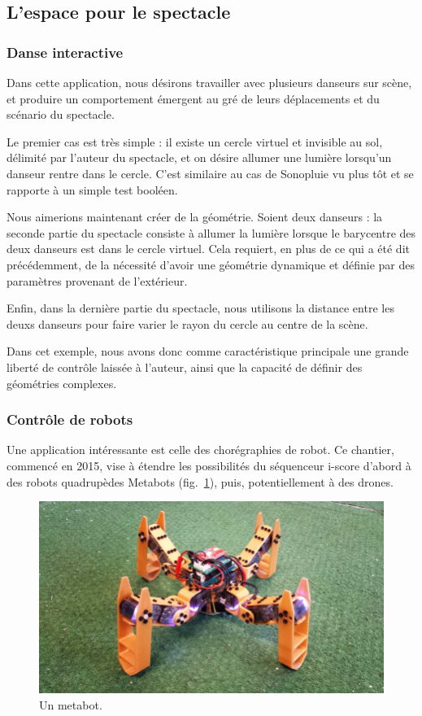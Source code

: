 \documentclass[french,12pt]{article}
\begin{document}
\subsection{L'espace pour le spectacle}
\subsubsection{Danse interactive}
Dans cette application, nous désirons travailler avec plusieurs danseurs sur scène, et produire un comportement émergent au gré de leurs déplacements et du scénario du spectacle.

Le premier cas est très simple : il existe un cercle virtuel et invisible au sol, délimité par l'auteur du spectacle, et on désire allumer une lumière lorsqu'un danseur rentre dans le cercle. C'est similaire au cas de Sonopluie vu plus tôt et se rapporte à un simple test booléen.

Nous aimerions maintenant créer de la géométrie. Soient deux danseurs : la seconde partie du spectacle consiste à allumer la lumière lorsque le barycentre des deux danseurs est dans le cercle virtuel. Cela requiert, en plus  de ce qui a été dit précédemment, de la nécessité d'avoir une géométrie dynamique et définie par des paramètres provenant de l'extérieur.

Enfin, dans la dernière partie du spectacle, nous utilisons la distance entre les deuxs danseurs pour faire varier le rayon du cercle au centre de la scène.

Dans cet exemple, nous avons donc comme caractéristique principale une grande liberté de contrôle laissée à l'auteur, ainsi que la capacité de définir des géométries complexes.

\subsubsection{Contrôle de robots}
Une application intéressante est celle des chorégraphies de robot. Ce chantier, commencé en 2015, vise à étendre les possibilités du séquenceur i-score d'abord à des robots quadrupèdes Metabots (fig.~\ref{fig.metabots}), puis, potentiellement à des drones.

\begin{figure}[h]
\centering
\includegraphics[scale=0.2]{images/spidey.jpg}
\caption{Un metabot.}
\label{fig.metabots}
\end{figure} %
\end{document}
